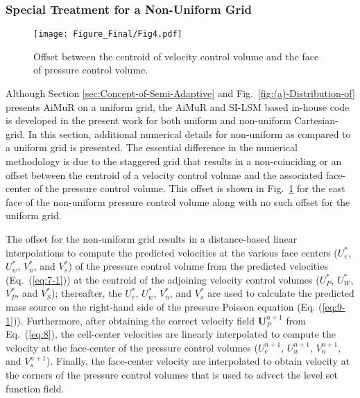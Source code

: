 \documentclass[preprint,12pt]{elsarticle}
\begin{document}
\subsubsection{Special Treatment for a Non-Uniform Grid}


\begin{figure}
\begin{centering}

\par\end{centering}

\begin{centering}
\texttt{[image: Figure\_Final/Fig4.pdf]}
\par\end{centering}

\protect\caption{\label{fig:Offset-between-velocity}Offset between the centroid of velocity
control volume and the face of pressure control volume.}


\end{figure}



Although Section \ref{sec:Concept-of-Semi-Adaptive} and Fig.~\ref{fig:(a)-Distribution-of}
presents AiMuR on a uniform grid, the AiMuR and SI-LSM based in-house
code is developed in the present work for both uniform and non-uniform
Cartesian-grid. In this section, additional numerical details for
non-uniform as compared to a uniform grid is presented. The essential
difference in the numerical methodology is due to the staggered grid
that results in a non-coinciding or an offset between the centroid
of a velocity control volume and the associated face-center of the
pressure control volume. This offset is shown in Fig.~\ref{fig:Offset-between-velocity}
for the east face of the non-uniform pressure control volume along
with no such offset for the uniform grid.

The offset for the non-uniform grid results in a distance-based linear
interpolations to compute the predicted velocities at the various
face centers ($U_{e}^{*}$, $U_{w}^{*}$, $V_{n}^{*}$, and $V_{s}^{*}$)
of the pressure control volume from the predicted velocities  (Eq.~(\ref{eq:7-1}))
at the centroid of the adjoining velocity control volumes ($U_{P}^{*}$,
$U_{W}^{*}$, $V_{P}^{*}$, and $V_{S}^{*}$); thereafter, the $U_{e}^{*}$,
$U_{w}^{*}$, $V_{n}^{*}$, and $V_{s}^{*}$ are used to calculate
the predicted mass source on the right-hand side of the pressure Poisson
equation (Eq. (\ref{eq:9-1})). Furthermore, after obtaining the correct
velocity field $\mathbf{U}_{P}^{n+1}$ from Eq.~(\ref{eq:8}), the
cell-center velocities are linearly interpolated to compute the velocity
at the face-center of the pressure control volumes ($U_{e}^{n+1}$,
$U_{w}^{n+1}$, $V_{n}^{n+1}$, and $V_{s}^{n+1}$). Finally, the
face-center velocity are  interpolated to obtain velocity  at the corners of
the pressure control volumes that is used to advect the level set
function field.
\end{document}
